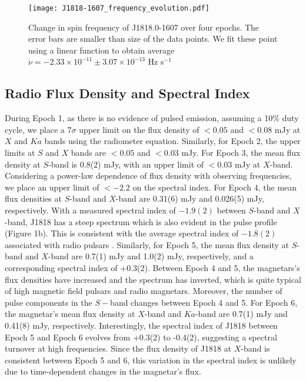 \documentclass[twocolumn]{emulateapj}
\begin{document}
\begin{figure*}[b]
	\centering
	\texttt{[image: J1818-1607\_frequency\_evolution.pdf]}
	\caption{ Change in spin frequency of J1818.0-1607 over four epochs. The error bars are smaller than size of the data points. We fit these point using a linear function to obtain average $\dot{\nu} = -2.33 \times 10^{-11} \pm 3.07 \times 10^{-13}$ Hz s$^{-1}$}%
	\label{Figure:Figure2}
\end{figure*}


\subsection{Radio Flux Density and Spectral Index}

During Epoch 1, as there is no evidence of pulsed emission, assuming a 10\% duty cycle, we place a 7$\sigma$ upper limit on the flux density of $< 0.05$ and $< 0.08$ mJy at $X$ and $Ka$ bands using the radiometer equation. Similarly, for Epoch 2, the upper limits at $S$ and $X$ bands are $< 0.05$ and $< 0.03$ mJy. For Epoch 3, the mean flux density at $S$-band is 0.8(2) mJy, with an upper limit of $< 0.03$ mJy at $X$-band. Considering a power-law dependence of flux density with observing frequencies, we place an upper limit of $< -2.2$ on the spectral index. For Epoch 4, the mean flux densities at $S$-band and $X$-band are 0.31(6) mJy and 0.026(5) mJy, respectively. With a measured spectral index of $-1.9(2)$ between $S$-band and $X$-band, J1818 has a steep spectrum which is also evident in the pulse profile (Figure 1b). This is consistent with the average spectral index of $-1.8(2)$ associated with radio pulsars \citep{maron2000}. Similarly, for Epoch 5, the mean flux density at $S$-band and $X$-band are 0.7(1) mJy and 1.0(2) mJy, respectively, and a corresponding spectral index of +0.3(2). Between Epoch 4 and 5, the magnetars's flux densities have increased and the spectrum has inverted, which is quite typical of high magnetic field pulsars and radio magnetars. Moreover, the number of pulse components in the $S-$band changes between Epoch 4 and 5. For Epoch 6, the magnetar's mean flux density at $X$-band and $Ka$-band are 0.7(1) mJy and 0.41(8) mJy, respectively. Interestingly, the spectral index of J1818 between Epoch 5 and Epoch 6 evolves from +0.3(2) to -0.4(2), suggesting a spectral turnover at high frequencies. Since the flux density of J1818 at $X$-band is consistent between Epoch 5 and 6, this variation in the spectral index is unlikely due to time-dependent changes in the magnetar's flux. %
\end{document}
